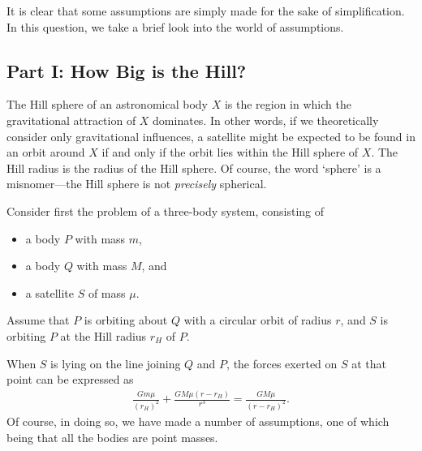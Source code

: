 \documentclass[a4paper,11pt]{exam}
\begin{document}
It is clear that some assumptions are simply made for the sake of simplification. In this question, we take a brief look into the world of assumptions.

\subsection*{Part I: How Big is the Hill?}
The Hill sphere of an astronomical body $X$ is the region in which the gravitational attraction of $ X $ dominates. In other words, if we theoretically consider only gravitational influences, a satellite might be expected to be found in an orbit around $X$ if and only if the orbit lies within the Hill sphere of $X$. The Hill radius is the radius of the Hill sphere. Of course, the word `sphere' is a misnomer---the Hill sphere is not \textit{precisely} spherical.

Consider first the problem of a three-body system, consisting of
\begin{itemize}
	\item a body $P$ with mass $m$,
	\item a body $Q$ with mass $M$, and
	\item a satellite $S$ of mass $\mu$.
\end{itemize}
Assume that $P$ is orbiting about $Q$ with a circular orbit of radius $r$, and $S$ is orbiting $P$ at the Hill radius $r_H$ of $P$.

When $S$ is lying on the line joining $Q$ and $P$, the forces exerted on $S$ at that point can be expressed as
\begin{align*}
\frac{Gm\mu}{(r_H)^2} + \frac{GM\mu(r-r_H)}{r^3} = \frac{GM\mu}{(r-r_H)^2}.
\end{align*}
Of course, in doing so, we have made a number of assumptions, one of which being that all the bodies are point masses.
\end{document}
